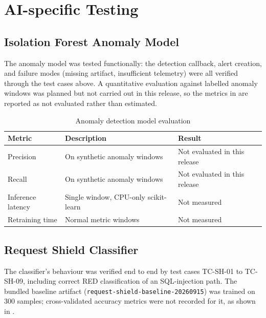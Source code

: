 \section{AI-specific Testing}

\subsection{Isolation Forest Anomaly Model \cite{liu2008isolation}}

The anomaly model was tested functionally: the detection callback, alert
creation, and failure modes (missing artifact, insufficient telemetry) were
all verified through the test cases above.  A quantitative evaluation against
labelled anomaly windows was planned but not carried out in this release, so
the metrics in  are reported as not evaluated rather than
estimated.

\begin{table}[H]
\centering
\caption{Anomaly detection model evaluation}\label{tab:ai_eval}
\begin{tabularx}{\textwidth}{@{}l X l@{}}
\toprule
\textbf{Metric} & \textbf{Description} & \textbf{Result}\\
\midrule
Precision & On synthetic anomaly windows & Not evaluated in this release\\
Recall & On synthetic anomaly windows & Not evaluated in this release\\
Inference latency & Single window, CPU-only scikit-learn & Not measured\\
Retraining time & Normal metric windows & Not measured\\
\bottomrule
\end{tabularx}
\end{table}

\subsection{Request Shield Classifier \cite{breiman2001random,cicids2017}}

The classifier's behaviour was verified end to end by test cases TC-SH-01 to
TC-SH-09, including correct RED classification of an SQL-injection path.  The
bundled baseline artifact (\texttt{request-shield-baseline-20260915}) was
trained on 300 samples; cross-validated accuracy metrics were not recorded for
it, as shown in .

